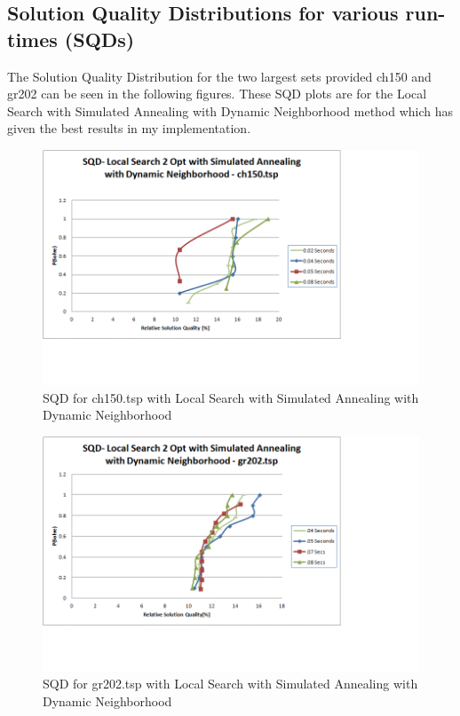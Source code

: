 \documentclass[twoside,11pt]{article}
\begin{document}
 
\subsection{Solution Quality Distributions for various run-times (SQDs)}
The Solution Quality Distribution  for the two largest sets provided ch150 and gr202 can be seen in the following figures. These SQD plots are for the Local Search with Simulated Annealing with Dynamic Neighborhood method which has given the best results in my implementation.
\begin{figure}[!htbp]
\centering
\caption{SQD for ch150.tsp with Local Search with Simulated Annealing with Dynamic Neighborhood}
\includegraphics[scale=.9]{images/sqd_dyn_ch150}
\end{figure}
\begin{figure}[!htbp]
\centering
\caption{SQD for gr202.tsp with Local Search with Simulated Annealing with Dynamic Neighborhood}
\includegraphics[scale=.9]{images/sqd_dyn_gr202}
\end{figure}
\end{document}
